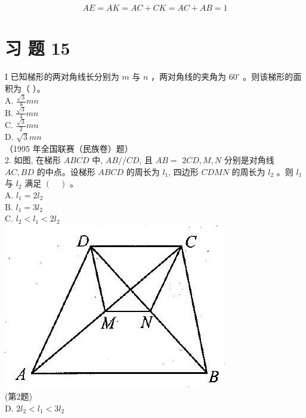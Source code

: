 \documentclass[10pt]{article}
\begin{document}
\begin{align*}
A E=A K=A C+C K=A C+A B=1
\end{align*}

\section*{习 题 15}
I 已知梯形的两对角线长分别为 $m$ 与 $n$ ，两对角线的夹角为 $60^{\circ}$ 。则该梯形的面积为（ ）。\\
A. $\frac{\sqrt{3}}{8} m n$\\
B. $\frac{\sqrt{3}}{4} m n$\\
C. $\frac{\sqrt{3}}{2} m n$\\
D. $\sqrt{3} m n$\\
（1995 年全国联赛（民族卷）题）\\
2. 如图, 在梯形 $A B C D$ 中, $A B / / C D$, 且 $A B=$ $2 C D, M, N$ 分别是对角线 $A C, B D$ 的中点。设梯形 $A B C D$ 的周长为 $l_{1}$, 四边形 $C D M N$ 的周长为 $l_{2}$ 。则 $l_{1}$ 与 $l_{2}$ 满足 $(\quad)$ 。\\
A. $l_{1}=2 l_{2}$\\
B. $l_{1}=3 l_{2}$\\
C. $l_{2}<l_{1}<2 l_{2}$\\
\includegraphics[max width=\textwidth, center]{2024_10_30_2c8f45efd4a519b08e1ag-144}\\
(第2题)\\
D. $2 l_{2}<l_{1}<3 l_{2}$
\end{document}
